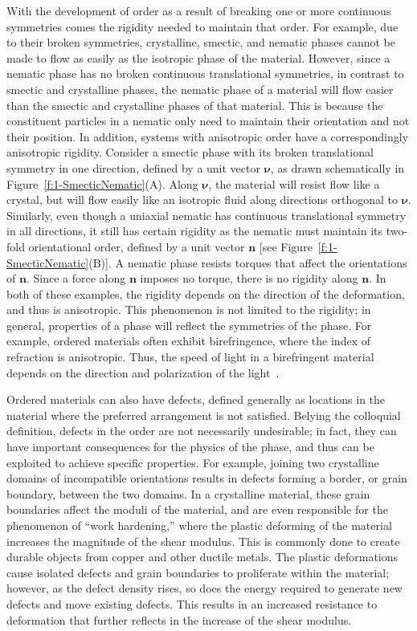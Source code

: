 With the development of order as a result of breaking one or more continuous symmetries comes the rigidity needed to maintain that order.
For example, due to their broken symmetries, crystalline, smectic, and nematic phases cannot be made to flow as easily as the isotropic phase of the material.
However, since a nematic phase has no broken continuous translational symmetries, in contrast to smectic and crystalline phases, the nematic phase of a material will flow easier than the smectic and crystalline phases of that material.
This is because the constituent particles in a nematic only need to maintain their orientation and not their position.
In addition, systems with anisotropic order have a correspondingly anisotropic rigidity.
Consider a smectic phase with its broken translational symmetry in one direction, defined by a unit vector $\bm{\nu}$, as drawn schematically in Figure~\ref{f:1-SmecticNematic}(A).
Along $\bm{\nu}$, the material will resist flow like a crystal, but will flow easily like an isotropic fluid along directions orthogonal to $\bm{\nu}$.
Similarly, even though a uniaxial nematic has continuous translational symmetry in all directions, it still has certain rigidity as the nematic must maintain its two-fold orientational order, defined by a unit vector $\bm{n}$ [see Figure~\ref{f:1-SmecticNematic}(B)].
A nematic phase resists torques that affect the orientations of $\bm{n}$. Since a force along $\bm{n}$ imposes no torque, there is no rigidity along $\bm{n}$.
In both of these examples, the rigidity depends on the direction of the deformation, and thus is anisotropic.
This phenomenon is not limited to the rigidity; in general, properties of a phase will reflect the symmetries of the phase.
For example, ordered materials often exhibit birefringence, where the index of refraction is anisotropic.
Thus, the speed of light in a birefringent material depends on the direction and polarization of the light~\cite{RN175}.

Ordered materials can also have defects, defined generally as locations in the material where the preferred arrangement is not satisfied.
Belying the colloquial definition, defects in the order are not necessarily undesirable; in fact, they can have important consequences for the physics of the phase, and thus can be exploited to achieve specific properties.
For example, joining two crystalline domains of incompatible orientations results in defects forming a border, or grain boundary, between the two domains.
In a crystalline material, these grain boundaries affect the moduli of the material, and are even responsible for the phenomenon of ``work hardening,'' where the plastic deforming of the material increases the magnitude of the shear modulus.
This is commonly done to create durable objects from copper and other ductile metals.
The plastic deformations cause isolated defects and grain boundaries to proliferate within the material; however, as the defect density rises, so does the energy required to generate new defects and move existing defects.
This results in an increased resistance to deformation that further reflects in the increase of the shear modulus.

